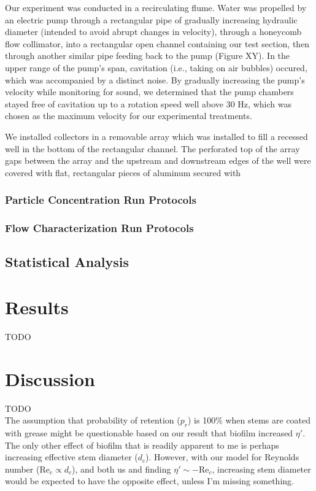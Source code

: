\documentclass[10pt,a4paper]{article}
\newcommand\Rey{\mathrm{Re}}
\begin{document}
Our experiment was conducted in a recirculating flume. Water was propelled by an electric pump through a rectangular pipe of gradually increasing hydraulic diameter (intended to avoid abrupt changes in velocity), through a honeycomb flow collimator, into a rectangular open channel containing our test section, then through another similar pipe feeding back to the pump (Figure XY). In the upper range of the pump's span, cavitation (i.e., taking on air bubbles) occured, which was accompanied by a distinct noise. By gradually increasing the pump's velocity while monitoring for sound, we determined that the pump chambers stayed free of cavitation up to a rotation speed well above 30 Hz, which was chosen as the maximum velocity for our experimental treatments.

We installed collectors in a removable array which was installed to fill a recessed well in the bottom of the rectangular channel. The perforated top of the array gaps between the array and the upstream and downstream edges of the well were covered with flat, rectangular pieces of aluminum secured with 

\subsubsection{Particle Concentration Run Protocols}



\subsubsection{Flow Characterization Run Protocols}



\subsection{Statistical Analysis}



\section{Results}

TODO



\section{Discussion}

TODO\\
\hfill\break
The assumption that probability of retention ($p_r$) is 100\% when stems are coated with grease might be questionable based on our result that biofilm increased $\eta\prime$. The only other effect of biofilm that is readily apparent to me is perhaps increasing effective stem diameter ($d_c$). However, with our model for Reynolds number ($\Rey_c \propto d_c$), and both us and \citet{Fauria_2015} finding $\eta\prime \sim -\Rey_c$, increasing stem diameter would be expected to have the opposite effect, unless I'm missing something.





\end{document}
